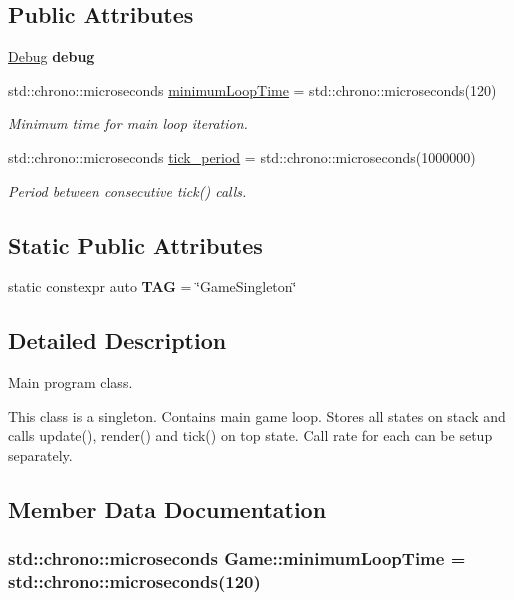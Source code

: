\subsection*{Public Attributes}
\begin{DoxyCompactItemize}
\item 
\hypertarget{classGame_a60b6ea0a4b4329525edf8db627429c19}{\hyperlink{classDebug}{Debug} {\bfseries debug}}\label{classGame_a60b6ea0a4b4329525edf8db627429c19}

\item 
std\-::chrono\-::microseconds \hyperlink{classGame_af9f24863bbe8102d1bf5d97aaa449d14}{minimum\-Loop\-Time} = std\-::chrono\-::microseconds(120)
\begin{DoxyCompactList}\small\item\em Minimum time for main loop iteration. \end{DoxyCompactList}\item 
std\-::chrono\-::microseconds \hyperlink{classGame_a65800b8c8afee406d719b404a4a78877}{tick\-\_\-period} = std\-::chrono\-::microseconds(1000000)
\begin{DoxyCompactList}\small\item\em Period between consecutive tick() calls. \end{DoxyCompactList}\end{DoxyCompactItemize}
\subsection*{Static Public Attributes}
\begin{DoxyCompactItemize}
\item 
\hypertarget{classGame_a43d300e0d66811f7317d88e3476d6de3}{static constexpr auto {\bfseries T\-A\-G} = \char`\"{}Game\-Singleton\char`\"{}}\label{classGame_a43d300e0d66811f7317d88e3476d6de3}

\end{DoxyCompactItemize}


\subsection{Detailed Description}
Main program class. 

This class is a singleton. Contains main game loop. Stores all states on stack and calls update(), render() and tick() on top state. Call rate for each can be setup separately. 

\subsection{Member Data Documentation}
\hypertarget{classGame_af9f24863bbe8102d1bf5d97aaa449d14}{
\subsubsection[{minimum\-Loop\-Time}]{\setlength{\rightskip}{0pt plus 5cm}std\-::chrono\-::microseconds Game\-::minimum\-Loop\-Time = std\-::chrono\-::microseconds(120)}}\label{classGame_af9f24863bbe8102d1bf5d97aaa449d14}


